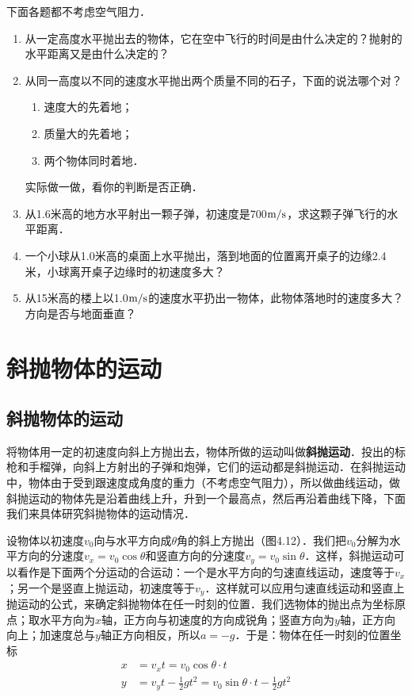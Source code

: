 下面各题都不考虑空气阻力．
\begin{enumerate}
\item 从一定高度水平抛出去的物体，它在空中飞行的时间是由什么决定的？抛射的水平距离又是由什么决定的？
\item 从同一高度以不同的速度水平抛出两个质量不同的石子，下面的说法哪个对？
\begin{enumerate}
	\item 速度大的先着地；
	\item  质量大的先着地；
	\item 两个物体同时着地．
\end{enumerate}
实际做一做，看你的判断是否正确．

\item 从1.6米高的地方水平射出一颗子弹，初速度是700$\text{m}/\text{s}$，求这颗子弹飞行的水平距离．
\item 一个小球从1.0米高的桌面上水平抛出，落到地面的位置离开桌子的边缘2.4米，小球离开桌子边缘时的初速度多大？
\item 从15米高的楼上以1.0$\text{m}/\text{s}$的速度水平扔出一物体，此物体落地时的速度多大？方向是否与地面垂直？

\end{enumerate}


\section{斜抛物体的运动}
\subsection{斜抛物体的运动} 

将物体用一定的初速度向斜上方抛出去，物体所做的运动叫做\textbf{斜抛运动}．投出的标枪和手榴弹，向斜上方射出的子弹和炮弹，它们的运动都是斜抛运动．在斜抛运动中，物体由于受到跟速度成角度的重力（不考虑空气阻力），所以做曲线运动，做斜抛运动的物体先是沿着曲线上升，升到一个最高点，然后再沿着曲线下降，下面我们来具体研究斜抛物体的运动情况．

设物体以初速度$v_0$向与水平方向成$\theta$角的斜上方抛出（图4.12）．我们把$v_0$分解为水平方向的分速度$v_x=v_0\cos\theta$和竖直方向的分速度$v_y=v_0\sin\theta$．这样，斜抛运动可以看作是下面两个分运动的合运动：一个是水平方向的匀速直线运动，速度等于$v_x$；另一个是竖直上抛运动，初速度等于$v_y$．这样就可以应用匀速直线运动和竖直上抛运动的公式，来确定斜抛物体在任一时刻的位置．我们选物体的抛出点为坐标原
点；取水平方向为$x$轴，正方向与初速度的方向成锐角；竖直方向为$y$轴，正方向向上；加速度总与$y$轴正方向相反，所以$a=-g$．于是：物体在任一时刻的位置坐标
\[\begin{split}
x&=v_x t=v_0\cos\theta \cdot t\\
y&=v_y t-\frac{1}{2}gt^2=v_0\sin\theta \cdot t-\frac{1}{2}gt^2
\end{split} \]

